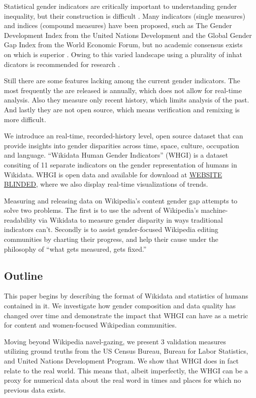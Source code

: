 \documentclass{sig-alternate-05-2015}
\begin{document}
Statistical gender indicators are critically important to understanding gender inequality, but their construction is difficult \cite{klasen_gender-related_2004}. Many indicators (single measures) and indices (compound measures) have been proposed, such as The Gender Development Index from the United Nations Development and the Global Gender Gap Index from the World Economic Forum, but no academic consensus exists on which is superior \cite{hawken_cross-national_2012}. Owing to this varied landscape using a plurality of inhat dicators is recommended for research \cite{jutting_measuring_2008}.

Still there are some features lacking among the current gender indicators. The most frequently the are released is annually, which does not allow for real-time analysis. Also they measure only recent history, which limits analysis of the past. And lastly they are not open source, which means verification and remixing is more difficult. 

We introduce an real-time, recorded-history level, open source dataset that can provide insights into gender disparities across time, space, culture, occupation and language. ``Wikidata Human Gender Indicators'' (WHGI) is a  dataset consiting  of 11 separate indicators on the gender representation of humans in Wikidata. WHGI is open data and available for download at \url{WEBSITE BLINDED}, where we also display real-time visualizations of trends.

Measuring and releasing data on Wikipedia's content gender gap attempts to solve two problems. The first is to use the advent of Wikipedia's machine-readability via Wikidata to measure gender disparity in ways traditional indicators can't. Secondly is to assist gender-focused Wikipedia editing communities by charting their progress, and help their cause under the philosophy of ``what gets measured, gets fixed.''

\subsection{Outline}

This paper begins by describing the format of Wikidata and stat\-istics of humans contained in it. We investigate how gender composition and data quality has changed over time and demonstrate the impact that WHGI can have as a metric for content and women-focused Wikipedian communities.  

Moving beyond Wikipedia navel-gazing, we present 3 validation measures utilizing ground truths from the US Census Bureau, Bureau for Labor Statistics, and United Nations Development Program. We show that WHGI does in fact relate to the real world. This means that, albeit imperfectly, the WHGI can be a proxy for numerical data about the real word in times and places for which no previous data exists.
\end{document}
